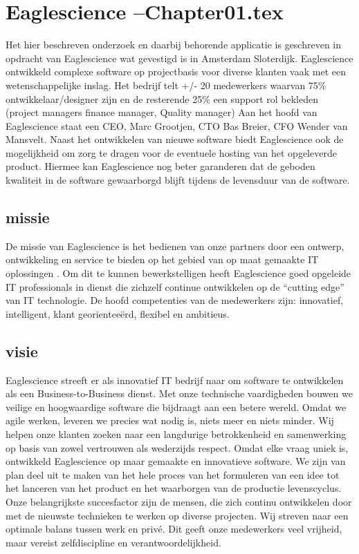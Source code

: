 \chapter{Eaglescience --Chapter01.tex} %

\label{ch:Eaglescience} %

Het hier beschreven onderzoek en daarbij behorende applicatie is geschreven in opdracht van Eaglescience wat gevestigd is in Amsterdam Sloterdijk. Eaglescience ontwikkeld complexe software op projectbasis voor diverse klanten vaak met een wetenschappelijke inslag. Het bedrijf telt +/- 20 medewerkers waarvan 75\% ontwikkelaar/designer zijn en de resterende 25\% een support rol bekleden (project managers finance manager, Quality manager)  Aan het hoofd van Eaglescience staat een CEO, Marc Grootjen, CTO Bas Breier, CFO Wender van Mansvelt. Naast het ontwikkelen van nieuwe software biedt Eaglescience ook de mogelijkheid om zorg te dragen voor de eventuele hosting van het opgeleverde product. Hiermee kan Eaglescience nog beter garanderen dat de geboden kwaliteit in de software gewaarborgd blijft tijdens de levensduur van de software.
\section{missie}
De missie van Eaglescience is het bedienen van onze partners door een ontwerp, ontwikkeling en service te bieden op het gebied van op maat gemaakte IT oplossingen . Om dit te kunnen bewerkstelligen heeft Eaglescience goed opgeleide IT professionals in dienst die zichzelf continue ontwikkelen op de “cutting edge” van IT technologie. De hoofd competenties van de medewerkers zijn: innovatief, intelligent, klant georientee\"erd, flexibel en ambitieus.
\section{visie}
Eaglescience streeft er als innovatief IT bedrijf naar om software te ontwikkelen als een Business-to-Business dienst. Met onze technische vaardigheden bouwen we veilige en hoogwaardige software die bijdraagt aan een betere wereld. Omdat we agile werken, leveren we precies wat nodig is, niets meer en niets minder. Wij helpen onze klanten zoeken naar een langdurige betrokkenheid en samenwerking op basis van zowel vertrouwen als wederzijds respect. Omdat elke vraag uniek is, ontwikkeld Eaglescience op maar gemaakte en innovatieve software. We zijn van plan deel uit te maken van het hele proces van het formuleren van een idee tot het lanceren van het product en het waarborgen van de productie levenscyclus. Onze belangrijkste succesfactor zijn de mensen, die zich continu ontwikkelen door met de nieuwste technieken te werken op diverse projecten. Wij streven naar een optimale balans tussen werk en priv\'e. Dit geeft onze medewerkers veel vrijheid, maar vereist zelfdiscipline en verantwoordelijkheid. 
